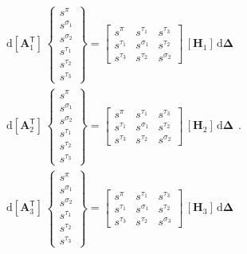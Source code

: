 \begin{equation}
\begin{aligned}
& \mathrm{d} [\mathbf{A}_1^{\mathsf{T}}] \, \begin{Bmatrix} s^{\pi} \\ s^{\sigma_1} \\ s^{\sigma_2} \\ s^{\tau_1} \\ s^{\tau_2} \\ s^{\tau_3}  \end{Bmatrix} = 
\begin{bmatrix}s^{\pi} & s^{\tau_1} & s^{\tau_3}\\ 
s^{\tau_1} & s^{\sigma_1} & s^{\tau_2} \\ 
s^{\tau_3} & s^{\tau_2} & s^{\sigma_2} \end{bmatrix} \, [\mathbf{H}_1] \, \mathrm{d} \boldsymbol{\Delta} \\
& \mathrm{d} [\mathbf{A}_2^{\mathsf{T}}] \, \begin{Bmatrix}s^{\pi} \\ s^{\sigma_1} \\ s^{\sigma_2}  \\ s^{\tau_1} \\ s^{\tau_2} \\ s^{\tau_3}  \end{Bmatrix} = 
\begin{bmatrix} s^{\pi} & s^{\tau_1} & s^{\tau_3}\\ 
s^{\tau_1} & s^{\sigma_1} & s^{\tau_2} \\ 
s^{\tau_3} & s^{\tau_2} & s^{\sigma_2}  \end{bmatrix} \, [\mathbf{H}_2] \, \mathrm{d} \boldsymbol{\Delta}\\
& \mathrm{d} [\mathbf{A}_3^{\mathsf{T}}] \, \begin{Bmatrix}s^{\pi} \\ s^{\sigma_1} \\ s^{\sigma_2}  \\ s^{\tau_1} \\ s^{\tau_2} \\ s^{\tau_3}  \end{Bmatrix} = 
\begin{bmatrix} s^{\pi} & s^{\tau_1} & s^{\tau_3}\\ 
s^{\tau_1} & s^{\sigma_1} & s^{\tau_2} \\ 
s^{\tau_3} & s^{\tau_2} & s^{\sigma_3}  \end{bmatrix} \, [\mathbf{H}_3] \, \mathrm{d} \boldsymbol{\Delta}
\end{aligned}.
\end{equation}
